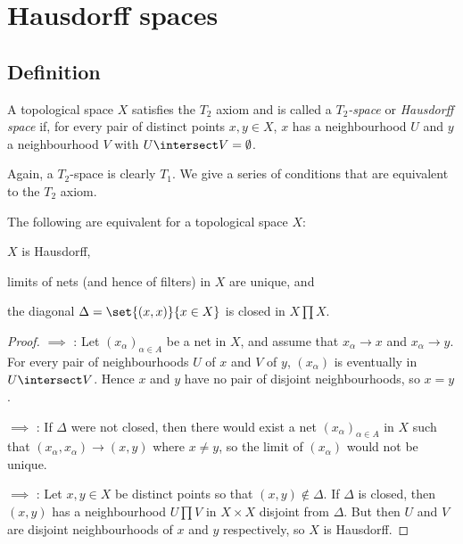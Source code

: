 \documentclass[article, a4paper, 11pt, oneside]{memoir}
\numberwithin{equation}{chapter}
\begin{document}
\chapter{Hausdorff spaces}

\section{Definition}

\begin{definition}
    A topological space $X$ satisfies the $T_2$ axiom and is called a \emph{$T_2$-space} or \emph{Hausdorff space} if, for every pair of distinct points $x,y \in X$, $x$ has a neighbourhood $U$ and $y$ a neighbourhood $V$ with $U \intersect V = \emptyset$.
\end{definition}
%
Again, a $T_2$-space is clearly $T_1$. We give a series of conditions that are equivalent to the $T_2$ axiom.


\begin{proposition}
    The following are equivalent for a topological space $X$:
    \begin{enumprop}
        \item \label{enum:T2-space} $X$ is Hausdorff,
        \item \label{enum:T2-limits_unique} limits of nets (and hence of filters) in $X$ are unique, and
        \item \label{enum:T2-closed_diagonal} the diagonal $\Delta = \set{(x,x)}{x \in X}$ is closed in $X \prod X$.
    \end{enumprop}
\end{proposition}

\begin{proof}
     $\implies$ : Let $(x_\alpha)_{\alpha \in A}$ be a net in $X$, and assume that $x_\alpha \to x$ and $x_\alpha \to y$. For every pair of neighbourhoods $U$ of $x$ and $V$ of $y$, $(x_\alpha)$ is eventually in $U \intersect V$. Hence $x$ and $y$ have no pair of disjoint neighbourhoods, so $x = y$.

     $\implies$ : If $\Delta$ were not closed, then there would exist a net $(x_\alpha)_{\alpha \in A}$ in $X$ such that $(x_\alpha, x_\alpha) \to (x,y)$ where $x \neq y$, so the limit of $(x_\alpha)$ would not be unique.

     $\implies$ : Let $x,y \in X$ be distinct points so that $(x,y) \not\in \Delta$. If $\Delta$ is closed, then $(x,y)$ has a neighbourhood $U \prod V$ in $X \times X$ disjoint from $\Delta$. But then $U$ and $V$ are disjoint neighbourhoods of $x$ and $y$ respectively, so $X$ is Hausdorff.
\end{proof}
\end{document}
